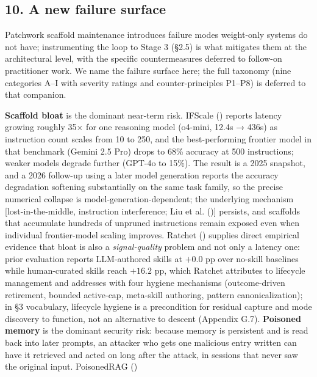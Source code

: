 \documentclass[
]{article}
\begin{document}
\subsection{10. A new failure surface}\label{a-new-failure-surface}

Patchwork scaffold maintenance introduces failure modes weight-only
systems do not have; instrumenting the loop to Stage 3 (§2.5) is what
mitigates them at the architectural level, with the specific
countermeasures deferred to follow-on practitioner work. We name the
failure surface here; the full taxonomy (nine categories A--I with
severity ratings and counter-principles P1--P8) is deferred to that
companion.

\textbf{Scaffold bloat} is the dominant near-term risk. IFScale
()
reports latency growing roughly 35× for one reasoning model (o4-mini,
12.4s → 436s) as instruction count scales from 10 to 250, and the
best-performing frontier model in that benchmark (Gemini 2.5 Pro) drops
to 68\% accuracy at 500 instructions; weaker models degrade further
(GPT-4o to 15\%). The result is a 2025 snapshot, and a 2026 follow-up
using a later model generation reports the accuracy degradation
softening substantially on the same task family, so the precise
numerical collapse is model-generation-dependent; the underlying
mechanism {[}lost-in-the-middle, instruction interference; {Liu et al.}
(){]} persists, and scaffolds that
accumulate hundreds of unpruned instructions remain exposed even when
individual frontier-model scaling improves. Ratchet
() supplies direct
empirical evidence that bloat is also a \emph{signal-quality} problem
and not only a latency one: prior evaluation reports LLM-authored skills
at \(+0.0\) pp over no-skill baselines while human-curated skills reach
\(+16.2\) pp, which Ratchet attributes to lifecycle management and
addresses with four hygiene mechanisms (outcome-driven retirement,
bounded active-cap, meta-skill authoring, pattern canonicalization); in
§3 vocabulary, lifecycle hygiene is a precondition for residual capture
and mode discovery to function, not an alternative to descent (Appendix
G.7). \textbf{Poisoned memory} is the dominant security risk: because
memory is persistent and is read back into later prompts, an attacker
who gets one malicious entry written can have it retrieved and acted on
long after the attack, in sessions that never saw the original input.
PoisonedRAG ()
\end{document}
